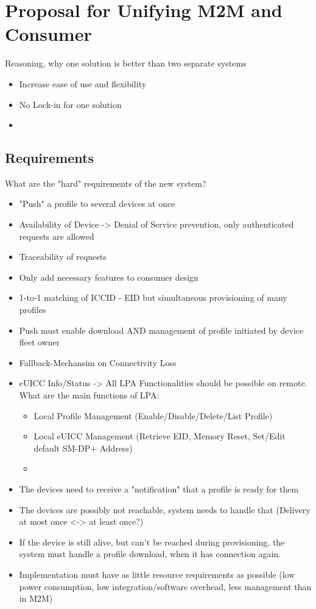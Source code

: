 
\chapter{Proposal for Unifying M2M and Consumer}\label{chapter:merging}

Reasoning, why one solution is better than two separate systems
\begin{itemize}
    \item Increase ease of use and flexibility
    \item No Lock-in for one solution
    \item 
\end{itemize}

\section{Requirements}
What are the "hard" requirements of the new system?
\begin{itemize}
    \item "Push" a profile to several devices at once
    \item  Availability of Device -> Denial of Service prevention, only authenticated requests are allowed
    \item Traceability of requests
    \item Only add necessary features to consumer design
    \item 1-to-1 matching of ICCID - EID but simultaneous provisioning of many profiles
    \item Push must enable download AND management of profile initiated by device fleet owner
    \item Fallback-Mechansim on Connectivity Loss
    \item eUICC Info/Status -> All LPA Functionalities should be possible on remote. What are the main functions of LPA:
    \begin{itemize}
        \item Local Profile Management (Enable/Disable/Delete/List Profile)
        \item Local eUICC Management (Retrieve EID, Memory Reset, Set/Edit default SM-DP+ Address)
        \item 
    \end{itemize}
    \item The devices need to receive a "notification" that a profile is ready for them
    \item The devices are possibly not reachable, system needs to handle that (Delivery at most once <-> at least once?)
    \item If the device is still alive, but can't be reached during provisioning, the system must handle a profile download, when it has connection again.
    \item Implementation must have as little resource requirements as possible (low power consumption, low integration/software overhead, less management than in M2M)
\end{itemize}
